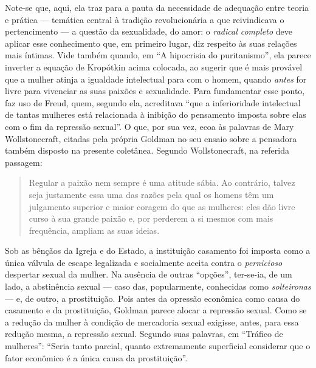 Note-se que, aqui, ela traz para a pauta da
necessidade de adequação entre teoria e prática --- temática central à
tradição revolucionária a que reivindicava o pertencimento --- a questão
da sexualidade, do amor: o \textit{radical completo} deve aplicar esse
conhecimento que, em primeiro lugar, diz respeito às suas relações mais
íntimas. Vide também quando, em ``A hipocrisia do puritanismo'', ela
parece inverter a equação de Kropótkin acima colocada, ao sugerir que é
mais provável que a mulher atinja a igualdade intelectual para com o
homem, quando \textit{antes} for livre para vivenciar as suas paixões e
sexualidade. Para fundamentar esse ponto, faz uso de Freud, quem,
segundo ela, acreditava ``que a inferioridade intelectual de tantas
mulheres está relacionada à inibição do pensamento imposta sobre elas
com o fim da repressão sexual''. O que, por sua vez, ecoa às palavras de
Mary Wollstonecraft, citadas pela própria Goldman no seu ensaio sobre a
pensadora também disposto na presente coletânea. Segundo Wollstonecraft,
na referida passagem:

\begin{quote}
Regular a paixão nem sempre é uma atitude sábia. Ao contrário, talvez
seja justamente essa uma das razões pela qual os homens têm um
julgamento superior e maior coragem do que as mulheres: eles dão livre
curso à sua grande paixão e, por perderem a si mesmos com mais
frequência, ampliam as suas ideias.
\end{quote}

Sob as bênçãos da Igreja e do Estado, a instituição casamento foi
imposta como a única válvula de escape legalizada e socialmente aceita
contra o \textit{pernicioso} despertar sexual da mulher. Na ausência de
outras ``opções'', ter-se-ia, de um lado, a abstinência sexual --- caso
das, popularmente, conhecidas como \textit{solteironas} --- e, de outro, a
prostituição. Pois antes da opressão econômica como causa do casamento e
da prostituição, Goldman parece alocar a repressão sexual. Como se a
redução da mulher à condição de mercadoria sexual exigisse,
antes, para essa redução mesma, a repressão sexual. Segundo suas
palavras, em ``Tráfico de mulheres'': ``Seria tanto parcial, quanto
extremamente superficial considerar que o fator econômico é a única
causa da prostituição''. 

